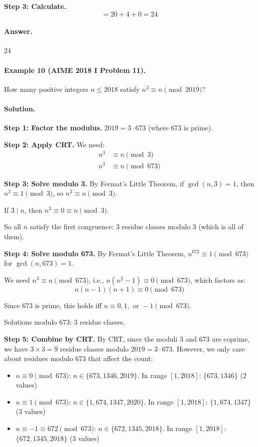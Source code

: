 \documentclass[12pt]{extarticle}
\begin{document}
\textbf{Step 3: Calculate.}
\[
= 20 + 4 + 0 = 24
\]

\paragraph{Answer.} $\boxed{24}$

\paragraph{Example 10 (AIME 2018 I Problem 11).} How many positive integers $n \le 2018$ satisfy $n^3 \equiv n \pmod{2019}$?

\paragraph{Solution.}
\textbf{Step 1: Factor the modulus.} $2019 = 3 \cdot 673$ (where 673 is prime).

\textbf{Step 2: Apply CRT.} We need:
\begin{align*}
n^3 &\equiv n \pmod{3} \\
n^3 &\equiv n \pmod{673}
\end{align*}

\textbf{Step 3: Solve modulo 3.} By Fermat's Little Theorem, if $\gcd(n, 3) = 1$, then $n^2 \equiv 1 \pmod{3}$, so $n^3 \equiv n \pmod{3}$.

If $3 \mid n$, then $n^3 \equiv 0 \equiv n \pmod{3}$.

So all $n$ satisfy the first congruence: 3 residue classes modulo 3 (which is all of them).

\textbf{Step 4: Solve modulo 673.} By Fermat's Little Theorem, $n^{672} \equiv 1 \pmod{673}$ for $\gcd(n, 673)=1$.

We need $n^3 \equiv n \pmod{673}$, i.e., $n(n^2 - 1) \equiv 0 \pmod{673}$, which factors as:
\[
n(n-1)(n+1) \equiv 0 \pmod{673}
\]

Since 673 is prime, this holds iff $n \equiv 0, 1, \text{ or } -1 \pmod{673}$.

Solutions modulo 673: 3 residue classes.

\textbf{Step 5: Combine by CRT.} By CRT, since the moduli 3 and 673 are coprime, we have $3 \times 3 = 9$ residue classes modulo $2019 = 3 \cdot 673$. However, we only care about residues modulo 673 that affect the count:

\begin{itemize}
    \item $n \equiv 0 \pmod{673}$: $n \in \{673, 1346, 2019\}$. In range $[1, 2018]$: $\{673, 1346\}$ (2 values)
    \item $n \equiv 1 \pmod{673}$: $n \in \{1, 674, 1347, 2020\}$. In range $[1, 2018]$: $\{1, 674, 1347\}$ (3 values)
    \item $n \equiv -1 \equiv 672 \pmod{673}$: $n \in \{672, 1345, 2018\}$. In range $[1, 2018]$: $\{672, 1345, 2018\}$ (3 values)
\end{itemize}
\end{document}
